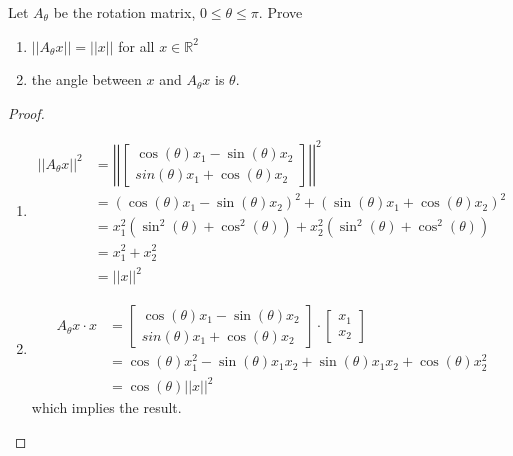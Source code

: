 \begin{exercise} \label{e1.4.7}
    Let \( A_\theta \) be the rotation matrix, \( 0 \leq \theta \leq \pi \). Prove
    
    \begin{enumerate}
        \item \( \vert\vert A_\theta x \vert \vert = \vert\vert x \vert\vert \) for all \( x \in \mathbb{R}^2 \)
        
        \item the angle between \( x \) and \( A_\theta x \) is \( \theta \).
    \end{enumerate}
    
    \begin{proof}
        \begin{enumerate}
            \item \begin{align*}
                \vert\vert A_\theta x \vert \vert^2 &= \left|\left| \begin{bmatrix} \cos(\theta)x_1 - \sin(\theta)x_2 \\ sin(\theta)x_1+\cos(\theta)x_2 \end{bmatrix} \right|\right|^2 \\
                &= \left( \cos(\theta)x_1 - \sin(\theta)x_2 \right)^2 + \left( \sin(\theta)x_1+\cos(\theta)x_2 \right)^2 \\
                &= x_1^2(\sin^2(\theta)+\cos^2(\theta))+x_2^2(\sin^2(\theta)+\cos^2(\theta)) \\
                &= x_1^2+x_2^2 \\
                &= \left|\left| x \right|\right|^2
            \end{align*}
            
            \item \begin{align*}
                A_\theta x \cdot x &= \begin{bmatrix} \cos(\theta)x_1 - \sin(\theta)x_2 \\ sin(\theta)x_1+\cos(\theta)x_2 \end{bmatrix} \cdot \begin{bmatrix} x_1 \\ x_2 \end{bmatrix} \\
                &= \cos(\theta)x_1^2-\sin(\theta)x_1x_2+\sin(\theta)x_1x_2+\cos(\theta)x_2^2 \\
                &= \cos(\theta)\left|\left| x \right|\right|^2
            \end{align*}
            which implies the result.
        \end{enumerate}
    \end{proof}
\end{exercise} %

